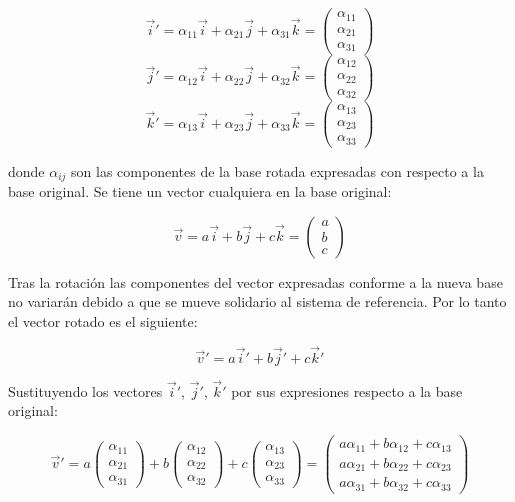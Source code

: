 \documentclass[10pt, a4paper]{report}
\begin{document}
$$ \vec{i}' = \alpha_{11}\vec{i} + \alpha_{21}\vec{j} + \alpha_{31}\vec{k} = \left( \begin{smallmatrix}  \alpha_{11}\\\alpha_{21}\\\alpha_{31} \end{smallmatrix} \right)$$
$$ \vec{j}' = \alpha_{12}\vec{i} + \alpha_{22}\vec{j} + \alpha_{32}\vec{k} = \left( \begin{smallmatrix} \alpha_{12}\\\alpha_{22}\\\alpha_{32} \end{smallmatrix} \right)$$
$$ \vec{k}' = \alpha_{13}\vec{i} + \alpha_{23}\vec{j} + \alpha_{33}\vec{k} = \left( \begin{smallmatrix} \alpha_{13}\\\alpha_{23}\\\alpha_{33} \end{smallmatrix} \right)$$

donde $\alpha_{ij}$ son las componentes de la base rotada expresadas con respecto a la base original. Se tiene un vector cualquiera en la base original:

$$ \vec{v} = a\vec{i} + b\vec{j} + c\vec{k} = \left( \begin{smallmatrix} a\\b\\c \end{smallmatrix} \right)$$

Tras la rotación las componentes del vector expresadas conforme a la nueva base no variarán debido a que se mueve solidario al sistema de referencia. Por lo tanto el vector rotado es el siguiente:

$$ \vec{v}' = a\vec{i}' + b\vec{j}' + c\vec{k}' $$

Sustituyendo los vectores $\vec{i}'$, $\vec{j}'$, $\vec{k}'$ por sus expresiones respecto a la base original:

$$ \vec{v}' = a\left( \begin{smallmatrix}  \alpha_{11}\\\alpha_{21}\\\alpha_{31} \end{smallmatrix} \right) + b\left( \begin{smallmatrix}  \alpha_{12}\\\alpha_{22}\\\alpha_{32} \end{smallmatrix} \right) + c\left( \begin{smallmatrix}  \alpha_{13}\\\alpha_{23}\\\alpha_{33} \end{smallmatrix} \right) = \left( \begin{smallmatrix}  a\alpha_{11} + b\alpha_{12} + c\alpha_{13} \\ a\alpha_{21} + b\alpha_{22} + c\alpha_{23}\\ a\alpha_{31} + b\alpha_{32} + c\alpha_{33} \end{smallmatrix} \right)$$
\end{document}
